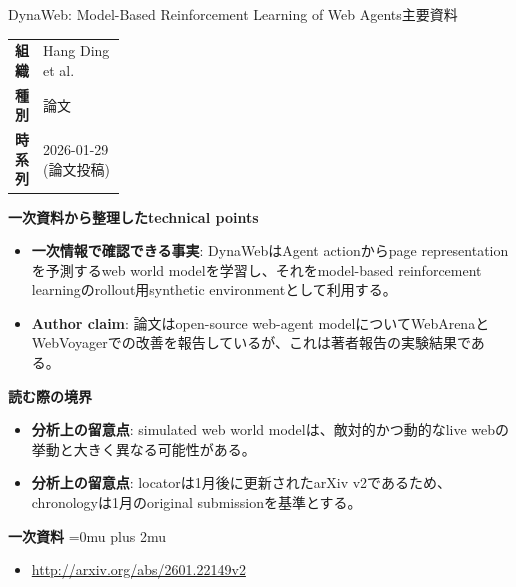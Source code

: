 \begin{technicalnote}{DynaWeb: Model-Based Reinforcement Learning of Web Agents}{主要資料}
\begingroup
\begin{tabularx}{\linewidth}{@{}>{\bfseries}p{0.22\linewidth}X@{}}
組織 & Hang Ding et al. \\
種別 & 論文 \\
時系列 & 2026-01-29 (論文投稿) \\
\end{tabularx}
\smallskip
{\bfseries 一次資料から整理したtechnical points}
\begin{itemize}[leftmargin=1.5em,itemsep=0.35em]
\item \textbf{一次情報で確認できる事実}: DynaWebはAgent actionからpage representationを予測するweb world modelを学習し、それをmodel-based reinforcement learningのrollout用synthetic environmentとして利用する。
\item \textbf{Author claim}: 論文はopen-source web-agent modelについてWebArenaとWebVoyagerでの改善を報告しているが、これは著者報告の実験結果である。
\end{itemize}
\begin{minipage}{\linewidth}
{\bfseries 読む際の境界}
\begin{itemize}[leftmargin=1.5em,itemsep=0.35em]
\item \textbf{分析上の留意点}: simulated web world modelは、敵対的かつ動的なlive webの挙動と大きく異なる可能性がある。
\item \textbf{分析上の留意点}: locatorは1月後に更新されたarXiv v2であるため、chronologyは1月のoriginal submissionを基準とする。
\end{itemize}
\begin{samepage}
{\bfseries 一次資料}
\begingroup\sloppy
\Urlmuskip=0mu plus 2mu\relax
\begin{itemize}[leftmargin=1.5em,itemsep=0.25em]
\item {\scriptsize\url{http://arxiv.org/abs/2601.22149v2}}
\end{itemize}
\endgroup
\end{samepage}
\end{minipage}
\endgroup
\end{technicalnote}
\medskip

